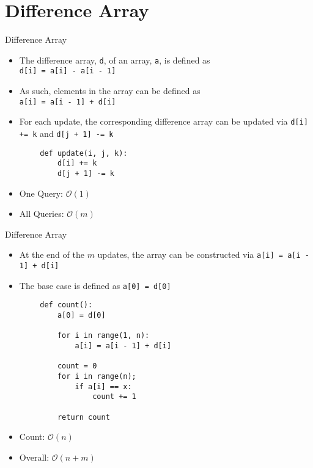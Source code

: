 \documentclass{beamer}
\begin{document}
\section{Difference Array}
\begin{frame}[fragile]{Difference Array}
    \begin{itemize}
        \item The difference array, \texttt{d}, of an array, \texttt{a}, is defined as \\ \texttt{d[i] = a[i] - a[i - 1]}
        \item As such, elements in the array can be defined as \\ \texttt{a[i] = a[i - 1] + d[i]}
        
        \item For each update, the corresponding difference array can be updated via \texttt{d[i] += k} and \texttt{d[j + 1] -= k}
    \end{itemize}
    
    \begin{lstlisting}
        def update(i, j, k):
            d[i] += k
            d[j + 1] -= k
    \end{lstlisting}
    
    \begin{itemize}
        \item One Query: $\mathcal{O}{(1)}$
        \item All Queries: $\mathcal{O}{(m)}$
    \end{itemize}
\end{frame}

\begin{frame}[fragile]{Difference Array}
    \begin{itemize}
        \item At the end of the $m$ updates, the array can be constructed via \texttt{a[i] = a[i - 1] + d[i]}
        \item The base case is defined as \texttt{a[0] = d[0]}
    \end{itemize}

    \begin{lstlisting}
        def count():
            a[0] = d[0]
            
            for i in range(1, n):
                a[i] = a[i - 1] + d[i]
            
            count = 0
            for i in range(n);
                if a[i] == x:
                    count += 1
            
            return count
    \end{lstlisting}
    
    \begin{itemize}
        \item Count: $\mathcal{O}{(n)}$
        \item Overall: $\mathcal{O}{(n + m)}$
    \end{itemize}
\end{frame}
\end{document}

